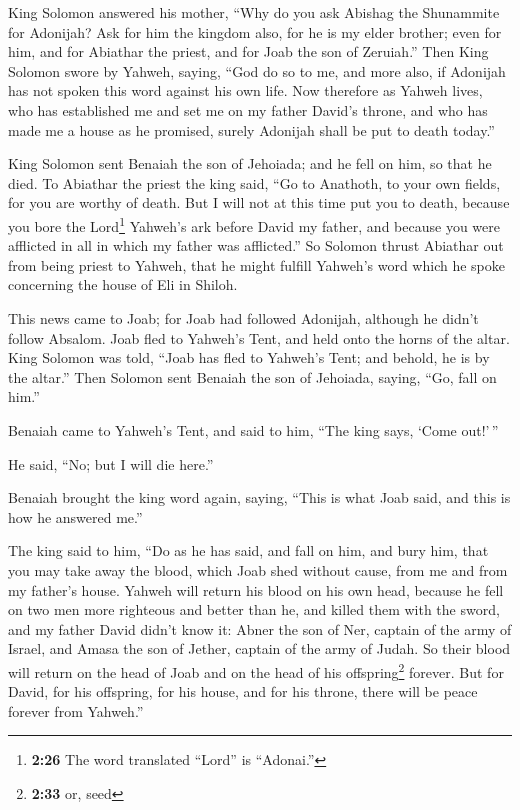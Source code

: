  King Solomon answered his mother, ``Why do you ask
Abishag the Shunammite for Adonijah? Ask for him the kingdom also, for
he is my elder brother; even for him, and for Abiathar the priest, and
for Joab the son of Zeruiah.''  Then King Solomon swore
by Yahweh, saying, ``God do so to me, and more also, if Adonijah has not
spoken this word against his own life.  Now therefore as
Yahweh lives, who has established me and set me on my father David's
throne, and who has made me a house as he promised, surely Adonijah
shall be put to death today.''

 King Solomon sent Benaiah the son of Jehoiada; and he
fell on him, so that he died.  To Abiathar the priest the
king said, ``Go to Anathoth, to your own fields, for you are worthy of
death. But I will not at this time put you to death, because you bore
the Lord\footnote{\textbf{2:26} The word translated ``Lord'' is
  ``Adonai.''} Yahweh's ark before David my father, and because you were
afflicted in all in which my father was afflicted.''  So
Solomon thrust Abiathar out from being priest to Yahweh, that he might
fulfill Yahweh's word which he spoke concerning the house of Eli in
Shiloh.

 This news came to Joab; for Joab had followed Adonijah,
although he didn't follow Absalom. Joab fled to Yahweh's Tent, and held
onto the horns of the altar.  King Solomon was told,
``Joab has fled to Yahweh's Tent; and behold, he is by the altar.'' Then
Solomon sent Benaiah the son of Jehoiada, saying, ``Go, fall on him.''

 Benaiah came to Yahweh's Tent, and said to him, ``The
king says, `Come out!'\,''

He said, ``No; but I will die here.''

Benaiah brought the king word again, saying, ``This is what Joab said,
and this is how he answered me.''

 The king said to him, ``Do as he has said, and fall on
him, and bury him, that you may take away the blood, which Joab shed
without cause, from me and from my father's house. 
Yahweh will return his blood on his own head, because he fell on two men
more righteous and better than he, and killed them with the sword, and
my father David didn't know it: Abner the son of Ner, captain of the
army of Israel, and Amasa the son of Jether, captain of the army of
Judah.  So their blood will return on the head of Joab
and on the head of his offspring\footnote{\textbf{2:33} or, seed}
forever. But for David, for his offspring, for his house, and for his
throne, there will be peace forever from Yahweh.''

